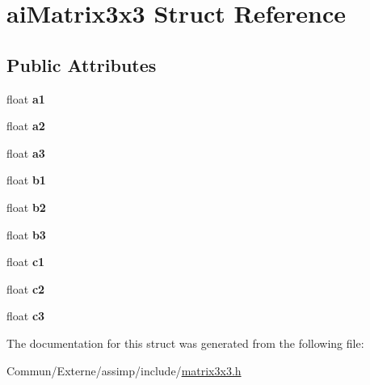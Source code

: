 \hypertarget{structai_matrix3x3}{}\section{ai\+Matrix3x3 Struct Reference}
\label{structai_matrix3x3}
\subsection*{Public Attributes}
\begin{DoxyCompactItemize}
\item 
float {\bfseries a1}\hypertarget{structai_matrix3x3_a6884258a2f50758ed8b554b531186917}{}\label{structai_matrix3x3_a6884258a2f50758ed8b554b531186917}

\item 
float {\bfseries a2}\hypertarget{structai_matrix3x3_a4c74733870193040ba4953fb673e77df}{}\label{structai_matrix3x3_a4c74733870193040ba4953fb673e77df}

\item 
float {\bfseries a3}\hypertarget{structai_matrix3x3_a851d391df32a39e1ced1a9a286b38cf4}{}\label{structai_matrix3x3_a851d391df32a39e1ced1a9a286b38cf4}

\item 
float {\bfseries b1}\hypertarget{structai_matrix3x3_a9eeba340d3502017caad70416f03863a}{}\label{structai_matrix3x3_a9eeba340d3502017caad70416f03863a}

\item 
float {\bfseries b2}\hypertarget{structai_matrix3x3_a9f5e25b60bbd7bdf8f0a19cd82cc6b15}{}\label{structai_matrix3x3_a9f5e25b60bbd7bdf8f0a19cd82cc6b15}

\item 
float {\bfseries b3}\hypertarget{structai_matrix3x3_a21aa4345fe6ce2774db94d118c536d02}{}\label{structai_matrix3x3_a21aa4345fe6ce2774db94d118c536d02}

\item 
float {\bfseries c1}\hypertarget{structai_matrix3x3_ae62a2877076cbee151e89cb34567e3ca}{}\label{structai_matrix3x3_ae62a2877076cbee151e89cb34567e3ca}

\item 
float {\bfseries c2}\hypertarget{structai_matrix3x3_a8e0d85d5c46eb4f4478f1fe159be4320}{}\label{structai_matrix3x3_a8e0d85d5c46eb4f4478f1fe159be4320}

\item 
float {\bfseries c3}\hypertarget{structai_matrix3x3_aa7eef894dec22db1011092410b24f19b}{}\label{structai_matrix3x3_aa7eef894dec22db1011092410b24f19b}

\end{DoxyCompactItemize}


The documentation for this struct was generated from the following file\+:\begin{DoxyCompactItemize}
\item 
Commun/\+Externe/assimp/include/\hyperlink{matrix3x3_8h}{matrix3x3.\+h}\end{DoxyCompactItemize}
